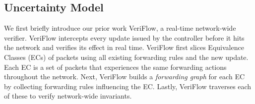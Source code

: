\subsection{Uncertainty Model}
\label{sec:model}










We first briefly introduce our prior work VeriFlow, a real-time network-wide  verifier.
VeriFlow intercepts every update issued by the controller before it hits the network and 
verifies its effect in real time.
VeriFlow first
slices  Equivalence Classes (ECs) of packets
using all existing forwarding rules and the new update.
Each EC is a set of packets that experiences the same forwarding actions throughout the network.
Next, VeriFlow builds a \emph{forwarding graph} for each EC 
by collecting forwarding rules influencing the EC. 
Lastly, VeriFlow traverses each of these 
to verify network-wide invariants.

